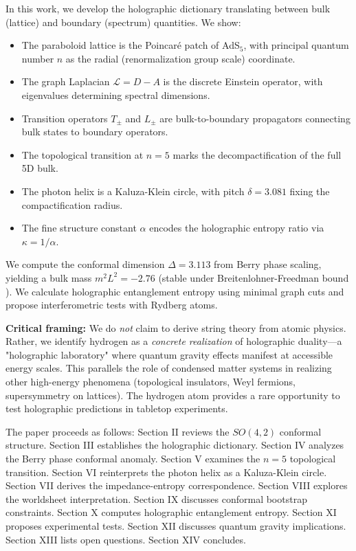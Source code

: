 \documentclass[aps,prd,twocolumn,superscriptaddress,floatfix]{revtex4-2}
\begin{document}
In this work, we develop the holographic dictionary translating between bulk (lattice) and boundary (spectrum) quantities. We show:

\begin{itemize}
\item The paraboloid lattice is the Poincaré patch of AdS$_5$, with principal quantum number $n$ as the radial (renormalization group scale) coordinate.
\item The graph Laplacian $\mathcal{L} = D - A$ is the discrete Einstein operator, with eigenvalues determining spectral dimensions.
\item Transition operators $T_\pm$ and $L_\pm$ are bulk-to-boundary propagators connecting bulk states to boundary operators.
\item The topological transition at $n=5$ marks the decompactification of the full 5D bulk.
\item The photon helix is a Kaluza-Klein circle, with pitch $\delta = 3.081$ fixing the compactification radius.
\item The fine structure constant $\alpha$ encodes the holographic entropy ratio via $\kappa = 1/\alpha$.
\end{itemize}

We compute the conformal dimension $\Delta = 3.113$ from Berry phase scaling, yielding a bulk mass $m^2 L^2 = -2.76$ (stable under Breitenlohner-Freedman bound \cite{breitenlohner1982}). We calculate holographic entanglement entropy using minimal graph cuts \cite{ryu2006,hubeny2007} and propose interferometric tests with Rydberg atoms.

\textbf{Critical framing:} We do \textit{not} claim to derive string theory from atomic physics. Rather, we identify hydrogen as a \textit{concrete realization} of holographic duality---a "holographic laboratory" where quantum gravity effects manifest at accessible energy scales. This parallels the role of condensed matter systems in realizing other high-energy phenomena (topological insulators, Weyl fermions, supersymmetry on lattices). The hydrogen atom provides a rare opportunity to test holographic predictions in tabletop experiments.

The paper proceeds as follows: Section II reviews the $SO(4,2)$ conformal structure. Section III establishes the holographic dictionary. Section IV analyzes the Berry phase conformal anomaly. Section V examines the $n=5$ topological transition. Section VI reinterprets the photon helix as a Kaluza-Klein circle. Section VII derives the impedance-entropy correspondence. Section VIII explores the worldsheet interpretation. Section IX discusses conformal bootstrap constraints. Section X computes holographic entanglement entropy. Section XI proposes experimental tests. Section XII discusses quantum gravity implications. Section XIII lists open questions. Section XIV concludes.
\end{document}
